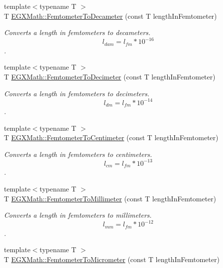 \begin{DoxyCompactItemize}
{\footnotesize template$<$typename T $>$ }\\T \mbox{\hyperlink{group___e_g_x_math-_conversions-_length_conversions-_s_i-_femtometer-_s_i_ga8d583b77d39b4474a8081997067ffb66}{E\+G\+X\+Math\+::\+Femtometer\+To\+Decameter}} (const T length\+In\+Femtometer)
\begin{DoxyCompactList}\small\item\em Converts a length in femtometers to decameters. \[ l_{dam}=l_{fm} * 10^{-16} \]. \end{DoxyCompactList}\item 
{\footnotesize template$<$typename T $>$ }\\T \mbox{\hyperlink{group___e_g_x_math-_conversions-_length_conversions-_s_i-_femtometer-_s_i_gad0f3dba7d53c7f17223b7f7b0f4db523}{E\+G\+X\+Math\+::\+Femtometer\+To\+Decimeter}} (const T length\+In\+Femtometer)
\begin{DoxyCompactList}\small\item\em Converts a length in femtometers to decimeters. \[ l_{dm}=l_{fm} * 10^{-14} \]. \end{DoxyCompactList}\item 
{\footnotesize template$<$typename T $>$ }\\T \mbox{\hyperlink{group___e_g_x_math-_conversions-_length_conversions-_s_i-_femtometer-_s_i_ga9a7e58a22b438341f8fffc8d78dd8483}{E\+G\+X\+Math\+::\+Femtometer\+To\+Centimeter}} (const T length\+In\+Femtometer)
\begin{DoxyCompactList}\small\item\em Converts a length in femtometers to centimeters. \[ l_{cm}=l_{fm} * 10^{-13} \]. \end{DoxyCompactList}\item 
{\footnotesize template$<$typename T $>$ }\\T \mbox{\hyperlink{group___e_g_x_math-_conversions-_length_conversions-_s_i-_femtometer-_s_i_ga2e6d6c0aad4502554b05f677ff248bc8}{E\+G\+X\+Math\+::\+Femtometer\+To\+Millimeter}} (const T length\+In\+Femtometer)
\begin{DoxyCompactList}\small\item\em Converts a length in femtometers to millimeters. \[ l_{mm}=l_{fm} * 10^{-12} \]. \end{DoxyCompactList}\item 
{\footnotesize template$<$typename T $>$ }\\T \mbox{\hyperlink{group___e_g_x_math-_conversions-_length_conversions-_s_i-_femtometer-_s_i_gac965667884f7a3449072effb83260fe8}{E\+G\+X\+Math\+::\+Femtometer\+To\+Micrometer}} (const T length\+In\+Femtometer)

\end{DoxyCompactItemize}
